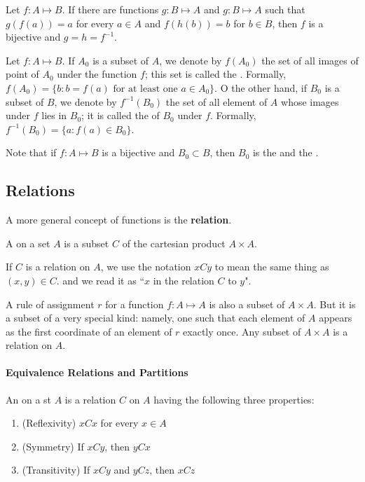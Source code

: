 \begin{lemmad}
Let $f: A \mapsto B$. If there are functions $g: B \mapsto A$ and $g: B \mapsto A$ such that $g(f(a)) = a$ for every $a \in A$ and $f(h(b)) = b$ for $b \in B$, then $f$ is a bijective and $g = h = f^{-1}$.
\end{lemmad}

\begin{definition}
Let $f: A \mapsto B$. If $A_0$ is a subset of $A$, we denote by $f(A_0)$ the set of all images of point of $A_0$ under the function $f$; this set is called the \textbf{}. Formally, $f(A_0) = \{b: b = f(a) \text{ for at least one } a\in A_0\}$. O the other hand, if $B_0$ is a subset of $B$, we denote by $f^{-1}(B_0)$ the set of all element of $A$ whose images under $f$ lies in $B_0$; it is called the \textbf{} of $B_0$ under $f$. Formally, $f^{-1}(B_0) = \{a: f(a) \in B_0\}$.
\end{definition}

Note that if $f:A \mapsto B$ is a bijective and $B_0 \subset B$, then $B_0$ is the  and the . 

\subsection{Relations}

A more general concept of functions is the \textbf{relation}.

\begin{definition}[relation]
A \textbf{} on a set $A$ is a subset $C$ of the cartesian product $A \times A$.
\end{definition}

If $C$ is a relation on $A$, we use the notation $xCy$ to mean the same thing as $(x, y) \in C$. and we read it as ``$x$ in the relation $C$ to $y$".

A rule of assignment $r$ for a function $f: A \mapsto A$ is also a subset of $A \times A$. But it is a subset of a very special kind: namely, one such that each element of $A$ appears as the first coordinate of an element of $r$ exactly once. Any subset of $A \times A$ is a relation on $A$.

\paragraph{Equivalence Relations and Partitions} An \textbf{} on a st $A$ is a relation $C$ on $A$ having the following three properties:
\begin{enumerate}[itemsep=0pt]
    \item (Reflexivity) $xCx$ for every $x \in A$
    \item (Symmetry) If $xCy$, then $yCx$
    \item (Transitivity) If $xCy$ and $yCz$, then $xCz$
\end{enumerate}

